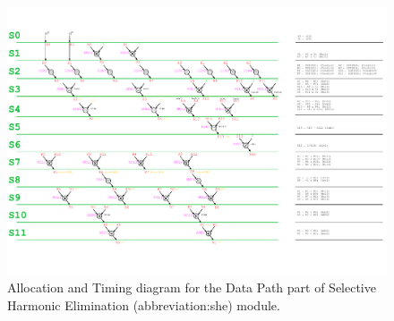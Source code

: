 \documentclass[a4paper, twoside, 11pt]{article}
\begin{document}
            \begin{figure}[htbp!]
                \centering
                \includegraphics[width=1\textwidth]{src/pdf/she-allocation-timing.pdf}
                           \caption{Allocation and Timing diagram for the Data Path part of Selective Harmonic Elimination (\gls{abbreviation:she}) module.}
                \label{fig:she-allocation-timing}
            \end{figure}

    \FloatBarrier
\end{document}
